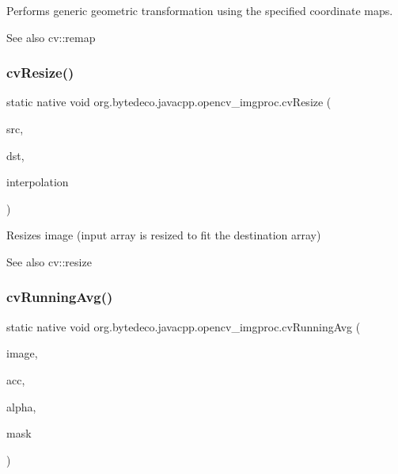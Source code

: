Performs generic geometric transformation using the specified coordinate maps. 

\begin{DoxySeeAlso}{See also}
cv\+::remap 
\end{DoxySeeAlso}
\mbox{\label{group__imgproc__c_ga45f9e0fb1d7c7f64227f5351c8e4bb2b}} 
\subsubsection{\texorpdfstring{cv\+Resize()}{cvResize()}}
{\footnotesize\ttfamily static native void org.\+bytedeco.\+javacpp.\+opencv\+\_\+imgproc.\+cv\+Resize (\begin{DoxyParamCaption}\item[{@Const Cv\+Arr}]{src,  }\item[{Cv\+Arr}]{dst,  }\item[{int}]{interpolation }\end{DoxyParamCaption})\hspace{0.3cm}{\ttfamily [static]}}



Resizes image (input array is resized to fit the destination array) 

\begin{DoxySeeAlso}{See also}
cv\+::resize 
\end{DoxySeeAlso}
\mbox{\label{group__imgproc__c_gaf06fc48b42683511a2fc75d1fe34b2e8}} 
\subsubsection{\texorpdfstring{cv\+Running\+Avg()}{cvRunningAvg()}}
{\footnotesize\ttfamily static native void org.\+bytedeco.\+javacpp.\+opencv\+\_\+imgproc.\+cv\+Running\+Avg (\begin{DoxyParamCaption}\item[{@Const Cv\+Arr}]{image,  }\item[{Cv\+Arr}]{acc,  }\item[{double}]{alpha,  }\item[{@Const Cv\+Arr}]{mask }\end{DoxyParamCaption})\hspace{0.3cm}{\ttfamily [static]}}



